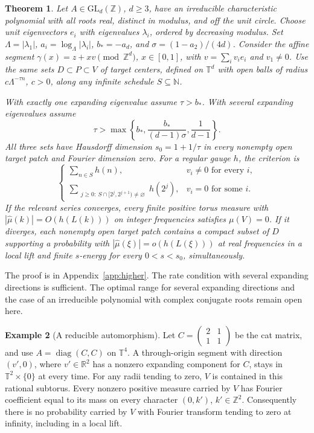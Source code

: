 \documentclass[11pt,a4paper,reqno]{amsart}
\newtheorem{theorem}{Theorem}[section]
\theoremstyle{definition}
\newtheorem{example}[theorem]{Example}
\theoremstyle{remark}
\numberwithin{equation}{section}
\begin{document}
\begin{theorem}\label{thm:higher}
Let \(A\in\mathrm{GL}_d(\mathbb Z)\), \(d\ge3\), have an irreducible characteristic polynomial with all roots real, distinct in modulus, and off the unit circle. Choose unit eigenvectors \(e_i\) with eigenvalues \(\lambda_i\), ordered by decreasing modulus. Set \(\Lambda=|\lambda_1|\), \(a_i=\log_{\Lambda}|\lambda_i|\), \(b_*=-a_d\), and \(\sigma=(1-a_2)/(4d)\). Consider the affine segment \(\gamma(x)=z+xv\pmod{\mathbb Z^d}\), \(x\in[0,1]\), with \(v=\sum_i v_i e_i\) and \(v_1\ne0\). Use the same sets \(D\subset P\subset V\) of target centers, defined on \(\mathbb T^d\) with open balls of radius \(c\Lambda^{-\tau n}\), \(c>0\), along any infinite schedule \(S\subseteq\mathbb N\).

With exactly one expanding eigenvalue assume \(\tau>b_*\). With several expanding eigenvalues assume
\[
 \tau>\max\left\{b_*,\frac{b_*}{(d-1)\sigma},\frac1{d-1}\right\}.
\]
All three sets have Hausdorff dimension \(s_0=1+1/\tau\) in every nonempty open target patch and Fourier dimension zero. For a regular gauge \(h\), the criterion is
\[
\begin{cases}
 \displaystyle\sum_{n\in S}h(n), & v_i\ne0\text{ for every }i,\\[4pt]
 \displaystyle\sum_{\substack{j\ge0:\ S\cap[2^j,2^{j+1})\ne\varnothing}} h(2^j), & v_i=0\text{ for some }i.
\end{cases}
\]
If the relevant series converges, every finite positive torus measure with \(|\widehat\mu(k)|=O(h(L(k)))\) on integer frequencies satisfies \(\mu(V)=0\). If it diverges, each nonempty open target patch contains a compact subset of \(D\) supporting a probability with \(|\widehat\mu(\xi)|=o(h(L(\xi)))\) at real frequencies in a local lift and finite \(s\)-energy for every \(0<s<s_0\), simultaneously.
\end{theorem}

The proof is in Appendix~\ref{app:higher}. The rate condition with several expanding directions is sufficient. The optimal range for several expanding directions and the case of an irreducible polynomial with complex conjugate roots remain open here.

\begin{example}[A reducible automorphism]\label{ex:higher-reducible}
Let \(C=\left(\begin{smallmatrix}2&1\\1&1\end{smallmatrix}\right)\) be the cat matrix, and use \(A=\operatorname{diag}(C,C)\) on \(\mathbb T^4\). A through-origin segment with direction \((v',0)\), where \(v'\in\mathbb R^2\) has a nonzero expanding component for \(C\), stays in \(\mathbb T^2\times\{0\}\) at every time. For any radii tending to zero, \(V\) is contained in this rational subtorus. Every nonzero positive measure carried by \(V\) has Fourier coefficient equal to its mass on every character \((0,k')\), \(k'\in\mathbb Z^2\). Consequently there is no probability carried by \(V\) with Fourier transform tending to zero at infinity, including in a local lift.
\end{example}
\end{document}
